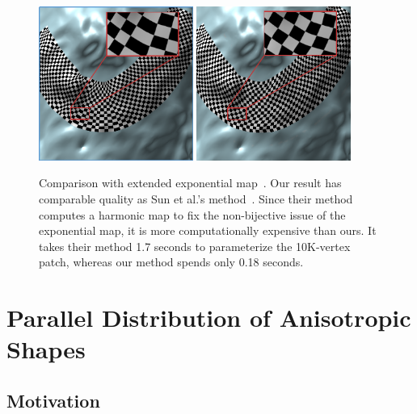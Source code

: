   \begin{figure}[!htb]
  \centering
  \includegraphics[width=0.45\textwidth]{figs/asd/sq_parameterization_result_enlarge.png}
  \includegraphics[width=0.45\textwidth]{figs/asd/wxn_parameterization_result_enlarge.png}
  \caption{Comparison with extended exponential map~\cite{Sun:2013:TBI:2448196.2448221}.
  Our result has comparable quality as Sun et al.'s method~\cite{Sun:2013:TBI:2448196.2448221}.
  Since their method computes a harmonic map to fix the non-bijective issue of the exponential map,
  it is more computationally expensive than ours.
  It takes their method 1.7 seconds to parameterize the 10K-vertex patch, whereas our method spends only 0.18 seconds.}
  \label{fig:parameterization_compare}
  \end{figure}




\section{Parallel Distribution of Anisotropic Shapes}

\subsection{Motivation}

